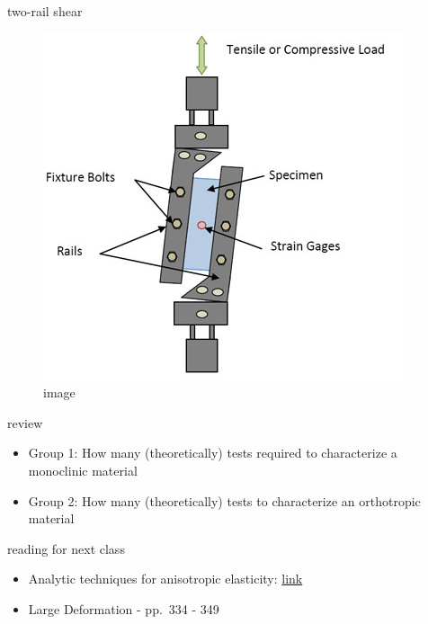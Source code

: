 \documentclass[
  letterpaper,
  ignorenonframetext,
  aspectratio=43,
  handout,
  12pt]{beamer}
\providecommand{\tightlist}{%
  \setlength{\itemsep}{0pt}\setlength{\parskip}{0pt}}
\providecommand{\tightlist}{%
\setlength{\itemsep}{0pt}\setlength{\parskip}{0pt}}
\let\Oldincludegraphics\includegraphics
\renewcommand{\includegraphics}[2][]{\Oldincludegraphics[width=\textwidth,height=0.7\textheight,keepaspectratio]{#2}}
\begin{document}
\begin{frame}{two-rail shear}
\protect\hypertarget{two-rail-shear}{}
\begin{figure}
\centering
\includegraphics{../images/two-rail.jpg}
\caption{image}
\end{figure}
\end{frame}

\begin{frame}{review}
\protect\hypertarget{review}{}
\begin{itemize}
\tightlist
\item
  Group 1: How many (theoretically) tests required to characterize a
  monoclinic material
\item
  Group 2: How many (theoretically) tests to characterize an orthotropic
  material
\end{itemize}
\end{frame}

\begin{frame}{reading for next class}
\protect\hypertarget{reading-for-next-class}{}
\begin{itemize}
\tightlist
\item
  Analytic techniques for anisotropic elasticity:
  \href{http://solidmechanics.org/text/Chapter5_5/Chapter5_5.htm}{link}
\item
  Large Deformation - pp.~334 - 349
\end{itemize}
\end{frame}
\end{document}
